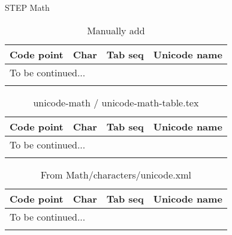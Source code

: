\documentclass[a4paper]{article}
\begin{document}
{\Large STEP Math}

\begin{longtable}{ccll}
  \caption{Manually add} \\
  \toprule
  Code point & Char & Tab seq & Unicode name \\
  \hline \endhead
  \multicolumn{4}{l}{To be continued...} \\ 
  \midrule \endfoot
  \bottomrule \endlastfoot

  

  \bottomrule
\end{longtable}

\cleardoublepage

\begin{longtable}{ccll}
  \caption{unicode-math / unicode-math-table.tex} \\
  \toprule
  Code point & Char & Tab seq & Unicode name \\
  \hline \endhead
  \multicolumn{4}{l}{To be continued...} \\ 
  \midrule \endfoot
  \bottomrule \endlastfoot

  

  \bottomrule
\end{longtable}

\cleardoublepage

\begin{longtable}{ccll}
  \caption{From Math/characters/unicode.xml} \\
  \toprule
  Code point & Char & Tab seq & Unicode name \\
  \hline \endhead
  \multicolumn{4}{l}{To be continued...} \\ 
  \midrule \endfoot
  \bottomrule \endlastfoot

  

  \bottomrule
\end{longtable}
\end{document}
